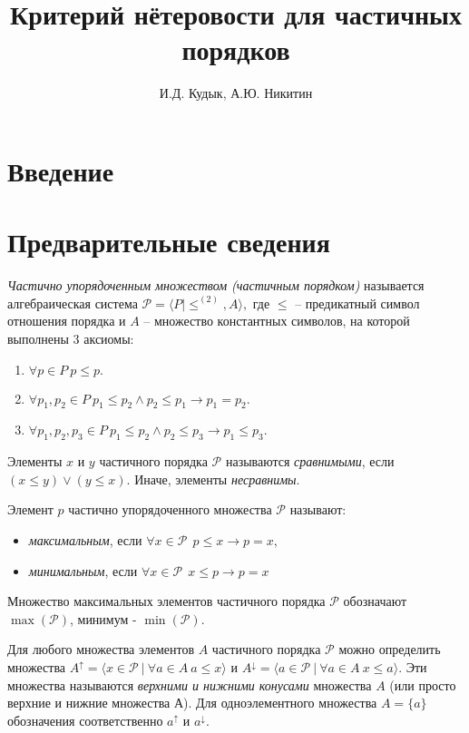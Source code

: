 \documentclass[12pt]{article}
\title{Критерий нётеровости для частичных порядков}
\author{И.Д. Кудык, А.Ю. Никитин}
\theoremstyle{break}
\def\P{\mathcal{P}}
\begin{document}
    \maketitle %
    \thispagestyle{empty} %
    \tableofcontents %
    \newpage
    
    \section{Введение} %

	\section{Предварительные сведения}
			
		\textit{Частично упорядоченным множеством (частичным порядком)} называется алгебраическая система $\P = \langle P | \leqslant^{(2)}, A\rangle,$ где $\leqslant$ -- предикатный символ отношения порядка и $A$ -- множество константных символов, на которой выполнены 3 аксиомы:
		\begin{enumerate}
			\item $\forall p\in P\ p\leqslant p.$
			\item $\forall p_1, p_2\in P\ p_1 \leqslant p_2 \wedge p_2 \leqslant p_1 \rightarrow p_1=p_2.$
			\item $\forall p_1, p_2, p_3\in P\ p_1 \leqslant p_2 \wedge p_2 \leqslant p_3 \rightarrow p_1 \leqslant p_3.$
		\end{enumerate}
		
		Элементы $x$ и $y$ частичного порядка $\P$ называются \textit{сравнимыми}, если $(x\leqslant y)\vee (y\leqslant x).$ Иначе, элементы \textit{несравнимы}.

		Элемент $p$ частично упорядоченного множества $\P$ называют:
		\begin{itemize}
			\item \textit{максимальным}, если $\forall x \in \P \ \ p\leqslant x \rightarrow p = x,$
			\item \textit{минимальным},  если $\forall x \in \P \ \ x\leqslant p \rightarrow p = x$
		\end{itemize}
		Множество максимальных элементов частичного порядка $\P$ обозначают $\max(\P)$, минимум - $\min(\P)$.

	
		Для любого множества элементов $A$ частичного порядка $\P$ можно определить множества $A^{\uparrow} = \langle x\in\P\ |\ \forall a\in A\ a\leqslant x\rangle$ и $A^{\downarrow} = \langle a\in\P\ |\ \forall a\in A\ x\leqslant a\rangle$. Эти множества называются \textit{верхними и нижними конусами} множества $A$ (или просто верхние и нижние множества А). Для одноэлементного множества $A=\{a\}$ обозначения соответственно $a^{\uparrow}$ и $a^{\downarrow}.$
\end{document}
